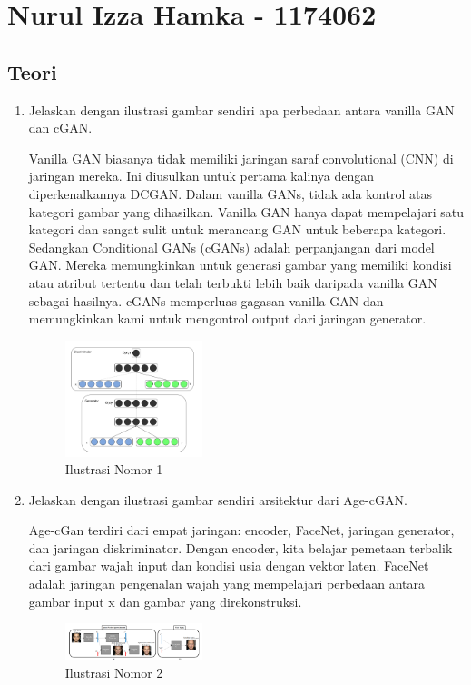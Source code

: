 \section{Nurul Izza Hamka - 1174062}
\subsection{Teori}
\begin{enumerate}

\item Jelaskan dengan ilustrasi gambar sendiri apa perbedaan antara vanilla GAN dan cGAN.

Vanilla GAN biasanya tidak memiliki jaringan saraf convolutional (CNN) di jaringan mereka. Ini diusulkan untuk pertama kalinya dengan diperkenalkannya DCGAN. Dalam vanilla GANs, tidak ada kontrol atas kategori gambar yang dihasilkan. Vanilla GAN hanya dapat mempelajari satu kategori dan sangat sulit untuk merancang GAN untuk beberapa kategori.\\
Sedangkan Conditional GANs (cGANs) adalah perpanjangan dari model GAN. Mereka memungkinkan untuk generasi gambar yang memiliki kondisi atau atribut tertentu dan telah terbukti lebih baik daripada vanilla GAN sebagai hasilnya. cGANs memperluas gagasan vanilla GAN dan memungkinkan kami untuk mengontrol output dari jaringan generator.

\begin{figure}
	\includegraphics[width=4cm]{figures/1174062/9/nomor1.png}
	\centering
	\caption{Ilustrasi Nomor 1 }
\end{figure}

\item Jelaskan dengan ilustrasi gambar sendiri arsitektur dari Age-cGAN.

Age-cGan terdiri dari empat jaringan: encoder, FaceNet, jaringan generator, dan jaringan diskriminator. Dengan encoder, kita belajar pemetaan terbalik dari gambar wajah input dan kondisi usia dengan vektor laten. FaceNet adalah jaringan pengenalan wajah yang mempelajari perbedaan antara gambar input x dan gambar yang direkonstruksi. 

\begin{figure}
	\includegraphics[width=4cm]{figures/1174062/9/nomor2.png}
	\centering
	\caption{Ilustrasi Nomor 2 }
\end{figure}


\end{enumerate}
